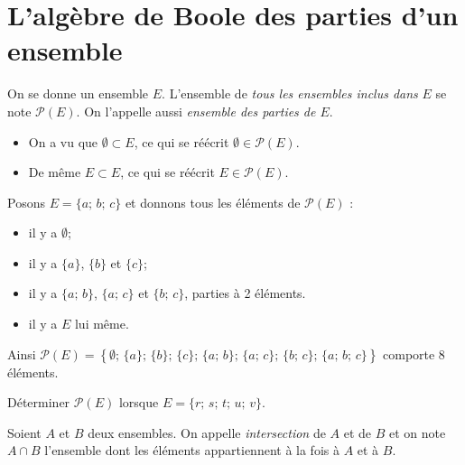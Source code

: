 \section{L'algèbre de Boole des parties d'un ensemble}
\begin{definition}
    On se donne un ensemble $E$. L'ensemble de \textit{tous les ensembles inclus dans } $E$ se note $\mathcal{P}(E)$. On l'appelle aussi \textit{ensemble des parties de $E$}.
    \begin{itemize}
        \item 	On a vu que $\emptyset\subset E$, ce qui se réécrit $\emptyset\in\mathcal{P}(E)$.
        \item 	De même $E\subset E$, ce qui se réécrit $E\in\mathcal{P}(E)$.
    \end{itemize}
\end{definition}
\begin{exemple}[]
    Posons $E=\lbrace a;\,b;\,c\rbrace$ et donnons tous les éléments de $\mathcal{P}(E)$ :
    \begin{itemize}
        \item 	il y a $\emptyset$;
        \item 	il y a $\lbrace a\rbrace$, $\lbrace b\rbrace$ et $\lbrace c\rbrace$;
        \item 	il y a $\lbrace a;\,b\rbrace$, $\lbrace a;\,c\rbrace$ et $\lbrace b;\,c\rbrace$, parties à 2 éléments.
        \item 	il y a $E$ lui même.
    \end{itemize}
    Ainsi $\mathcal{P}(E)=\left\lbrace \emptyset;\,\lbrace a\rbrace ;\,\lbrace b\rbrace ;\,\lbrace c\rbrace ;\,\lbrace a;\,b\rbrace ;\,\lbrace a;\,c\rbrace ;\,\lbrace b;\,c\rbrace ;\,\lbrace a;\,b;\,c\rbrace \right\rbrace$ comporte 8 éléments.
\end{exemple}

\begin{exercice}[]
    Déterminer $\mathcal{P}(E)$ lorsque $E=\lbrace r;\,s;\,t;\,u;\,v\rbrace$.
\end{exercice}
\begin{definition}[ : intersection]
    \begin{center}
    \end{center}
    Soient $A$ et $B$ deux ensembles. On appelle \textit{intersection} de $A$ et de $B$ et on note $A\cap B$ l'ensemble dont les éléments appartiennent à la
    fois à $A$ et à $B$.
\end{definition}

